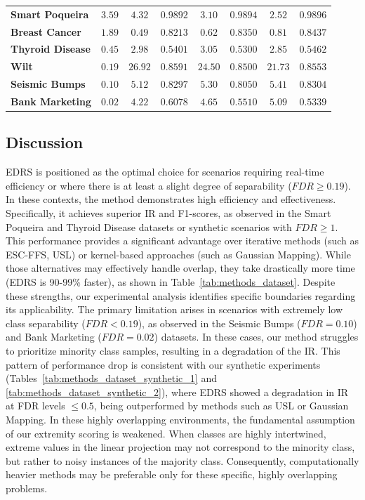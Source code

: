 \documentclass[preprint,12pt]{elsarticle}
\begin{document}
\begin{table}[!h]
{\begin{tabular}{llcccccc}
\textbf{Smart Poqueira} & $3.59$ & $4.32$ & $0.9892$ & $3.10$ & $0.9894$ & $\mathbf{2.52}$ & $\mathbf{0.9896}$ \\
\textbf{Breast Cancer} & $1.89$ & $0.49$ & $0.8213$ & $0.62$ & $0.8350$ & $\mathbf{0.81}$ & $\mathbf{0.8437}$ \\
\textbf{Thyroid Disease} & $0.45$ & $2.98$ & $0.5401$ & $3.05$ & $0.5300$ & $\mathbf{2.85}$ & $\mathbf{0.5462}$ \\
\textbf{Wilt} & $0.19$ & $26.92$ & $\mathbf{0.8591}$ & $24.50$ & $0.8500$ & $\mathbf{21.73}$ & $0.8553$ \\
\textbf{Seismic Bumps} & $0.10$ & $\mathbf{5.12}$ & $0.8297$ & $5.30$ & $0.8050$ & $5.41$ & $\mathbf{0.8304}$ \\
\textbf{Bank Marketing} & $0.02$ & $\mathbf{4.22}$ & $\mathbf{0.6078}$ & $4.65$ & $0.5510$ & $5.09$ & $0.5339$ \\ \bottomrule
\end{tabular}%
}
\end{table}


\subsection{Discussion}

EDRS is positioned as the optimal choice for scenarios requiring real-time efficiency or where there is at least a slight degree of separability ($FDR \ge 0.19$). In these contexts, the method demonstrates high efficiency and effectiveness. Specifically, it achieves superior IR and F1-scores, as observed in the Smart Poqueira and Thyroid Disease datasets or synthetic scenarios with $FDR \ge 1$. This performance provides a significant advantage over iterative methods (such as ESC-FFS, USL) or kernel-based approaches (such as Gaussian Mapping). While those alternatives may effectively handle overlap, {\color{blue}they take} drastically {\color{blue}more time (EDRS is 90-99\% faster)}, as shown in Table~\ref{tab:methods_dataset}. Despite these strengths, our experimental analysis identifies specific boundaries regarding its applicability. The primary limitation arises in scenarios with extremely low class separability ($FDR < 0.19$), as observed in the Seismic Bumps ($FDR=0.10$) and Bank Marketing ($FDR=0.02$) datasets. In these cases, our method struggles to prioritize minority class samples, resulting in a degradation of the IR. This pattern of performance drop is consistent with our synthetic experiments (Tables~\ref{tab:methods_dataset_synthetic_1} and \ref{tab:methods_dataset_synthetic_2}), where EDRS showed a degradation in IR at FDR levels $\le 0.5$, being outperformed by methods such as USL or Gaussian Mapping. In these highly overlapping environments, the fundamental assumption of our extremity scoring is weakened. When classes are highly intertwined, extreme values in the linear projection may not correspond to the minority class, but rather to noisy instances of the majority class. Consequently, computationally heavier methods may be preferable only for these specific, highly overlapping problems. 
\end{document}
